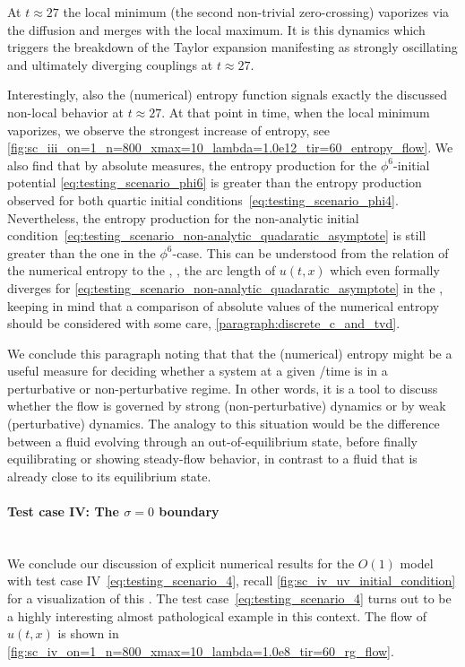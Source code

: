 At $t \approx 27$ the local minimum (the second non-trivial zero-crossing) vaporizes via the diffusion and merges with the local maximum.
It is this dynamics which triggers the breakdown of the Taylor expansion manifesting as strongly oscillating and ultimately diverging couplings at $t \approx 27$. \bigskip

Interestingly, also the (numerical) entropy function signals exactly the discussed non-local behavior at $t \approx 27$.
At that point in time, when the local minimum vaporizes, we observe the strongest increase of entropy, see \cref{fig:sc_iii_on=1_n=800_xmax=10_lambda=1.0e12_tir=60_entropy_flow}.
We also find that by absolute measures, the entropy production for the $\phi^6$-initial potential \eqref{eq:testing_scenario_phi6} is greater than the entropy production observed for both quartic initial conditions~\eqref{eq:testing_scenario_phi4}.
Nevertheless, the entropy production for the non-analytic initial condition~\eqref{eq:testing_scenario_non-analytic_quadaratic_asymptote} is still greater than the one in the $\phi^6$-case.
This can be understood from the relation of the numerical entropy to the \tv{}, \ie{}, the arc length of $u ( t, x )$ which even formally diverges for \cref{eq:testing_scenario_non-analytic_quadaratic_asymptote} in the \uv{}, keeping in mind that a comparison of absolute values of the numerical entropy should be considered with some care, \cf{} \cref{paragraph:discrete_c_and_tvd}.
	
We conclude this paragraph noting that that the (numerical) entropy might be a useful measure for deciding whether a system at a given \rgscale{}/time is in a perturbative or non-perturbative regime.
In other words, it is a tool to discuss whether the \frg{} flow is governed by strong (non-perturbative) dynamics or by weak (perturbative) dynamics.
The \cfd{} analogy to this situation would be the difference between a fluid evolving through an out-of-equilibrium state, before finally equilibrating or showing steady-flow behavior, in contrast to a fluid that is already close to its equilibrium state.

\paragraph{Test case IV: The \texorpdfstring{$\sigma = 0$}{sigma=0} boundary}\label{paragraph:sc4O1}\mbox{}\\%
We conclude our discussion of explicit numerical results for the $O(1)$ model with test case IV~\eqref{eq:testing_scenario_4}, recall \cref{fig:sc_iv_uv_initial_condition} for a visualization of this \ic{}.
The test case~\eqref{eq:testing_scenario_4} turns out to be a highly interesting almost pathological example in this context.
The \frg{} flow of $u ( t, x )$ is shown in \cref{fig:sc_iv_on=1_n=800_xmax=10_lambda=1.0e8_tir=60_rg_flow}.


